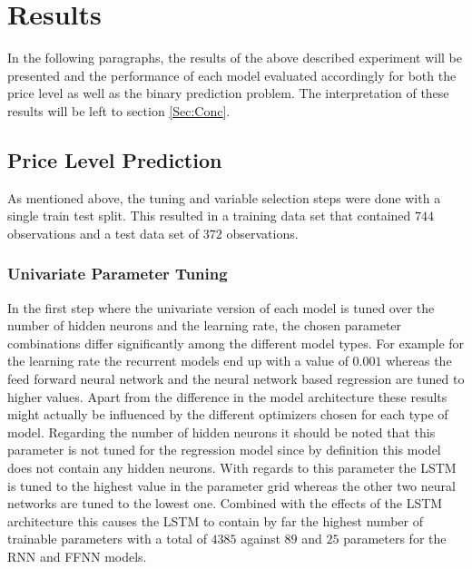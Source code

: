 \chapter{Results}
In the following paragraphs, the results of the above described experiment will be presented and the performance of each model evaluated accordingly for both the price level as well as the binary prediction problem. The interpretation of these results will be left to section \ref{Sec:Conc}.
\section{Price Level Prediction}
As mentioned above, the tuning and variable selection steps were done with a single train test split. This resulted in a training data set that contained $744$ observations and a test data set of $372$ observations.
\subsection{Univariate Parameter Tuning}
In the first step where the univariate version of each model is tuned over the number of hidden neurons and the learning rate, the chosen parameter combinations differ significantly among the different model types. For example for the learning rate the recurrent models end up with a value of $0.001$ whereas the feed forward neural network and the neural network based regression are tuned to higher values. Apart from the difference in the model architecture these results might actually be influenced by the different optimizers chosen for each type of model. Regarding the number of hidden neurons it should be noted that this parameter is not tuned for the regression model since by definition this model does not contain any hidden neurons. With regards to this parameter the LSTM is tuned to the highest value in the parameter grid whereas the other two neural networks are tuned to the lowest one. Combined with the effects of the LSTM architecture this causes the LSTM to contain by far the highest number of trainable parameters with a total of $4385$ against $89$ and $25$ parameters for the RNN and FFNN models.

